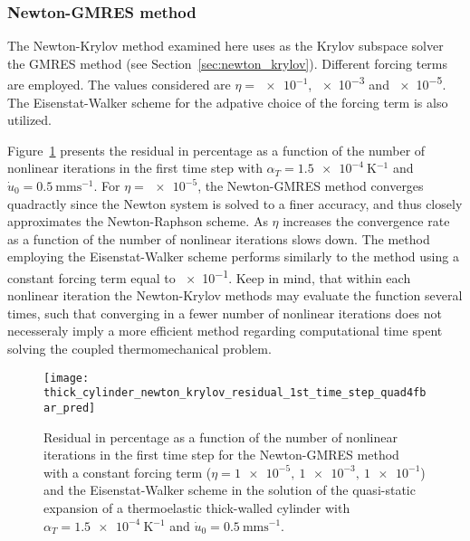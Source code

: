\FloatBarrier

\subsubsection{Newton-GMRES method}

The Newton-Krylov method examined here uses as the Krylov subspace solver the GMRES method (see Section~\ref{sec:newton_krylov}).
Different forcing terms are employed.
The values considered are \(\eta=\num[print-unity-mantissa=false]{e-1}\), \num[print-unity-mantissa=false]{e-3} and \num[print-unity-mantissa=false]{e-5}.
The Eisenstat-Walker scheme for the adpative choice of the forcing term is also utilized.

Figure~\ref{fig:thick_cylinder_newton_krylov_residual_1st_time_step_quad4fbar_pred} presents the residual in percentage as a function of the number of nonlinear iterations in the first time step with \(\alpha_T=\SI{1.5e-4}{\kelvin^{-1}}\) and \(\dot u_0 =\SI{0.5}{\milli\meter\second^{-1}}\).
For \(\eta=\num{e-5}\), the Newton-GMRES method converges quadractly since the Newton system is solved to a finer accuracy, and thus closely approximates the Newton-Raphson scheme.
As \(\eta\) increases the convergence rate as a function of the number of nonlinear iterations slows down.
The method employing the Eisenstat-Walker scheme performs similarly to the method using a constant forcing term equal to \num{e-1}.
Keep in mind, that within each nonlinear iteration the Newton-Krylov methods may evaluate the function several times, such that converging in a fewer number of nonlinear iterations does not necesseraly imply a more efficient method regarding computational time spent solving the coupled thermomechanical problem.

\begin{figure}
  \centering
  \texttt{[image: thick\_cylinder\_newton\_krylov\_residual\_1st\_time\_step\_quad4fbar\_pred]}
  \caption{Residual in percentage as a function of the number of nonlinear iterations in the first time step for the Newton-GMRES method with a constant forcing term (\(\eta=\num{1e-5},\ \num{1e-3},\ \num{1e-1}\)) and the Eisenstat-Walker scheme in the solution of the quasi-static expansion of a thermoelastic thick-walled cylinder with \(\alpha_T=\SI{1.5e-4}{\kelvin^{-1}}\) and \(\dot u_0 =\SI{0.5}{\milli\meter\second^{-1}}\).}
\label{fig:thick_cylinder_newton_krylov_residual_1st_time_step_quad4fbar_pred}
\end{figure}

